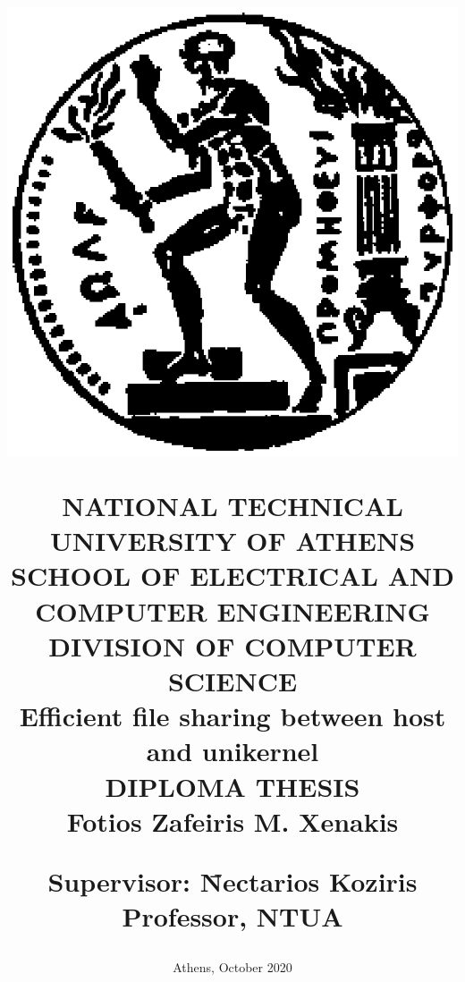 \documentclass[12pt, a4paper, notitlepage]{report}
\begin{document}
\title{
	\vspace*{-8ex}
	\begin{center}
		\includegraphics[scale=0.4]{pyrforos.eps}
	\end{center}
	\Large{N}\large{ATIONAL}
	\Large{T}\large{ECHNICAL}
	\Large{U}\large{NIVERSITY}
	\Large{O}\large{F}
	\Large{A}\large{THENS} \\
	\normalsize{S}\small{CHOOL}
	\normalsize{O}\small{F}
	\normalsize{E}\small{LECTRICAL}
	\normalsize{A}\small{ND}
	\normalsize{C}\small{OMPUTER}
	\normalsize{E}\small{NGINEERING} \\
	\vspace{2ex}
	\normalsize{D}\small{IVISION}
	\normalsize{O}\small{F}
	\normalsize{C}\small{OMPUTER}
	\normalsize{S}\small{CIENCE} \\
	\vspace{14ex}
	\large\textbf{Efficient file sharing between host and unikernel} \\
	\vspace{14ex}
	\large{DIPLOMA THESIS} \\
	\vspace{1ex}
	\center\textbf{Fotios Zafeiris M. Xenakis}
	\vfill
	\begin{tabbing}
		\normalsize
		\textbf{Supervisor}: \= Nectarios Koziris \\
							 \> Professor, NTUA
	\end{tabbing}
}
\author{}	%
\date{
	\normalsize{Athens, October 2020}
}
\maketitle
\thispagestyle{empty}
\end{document}
